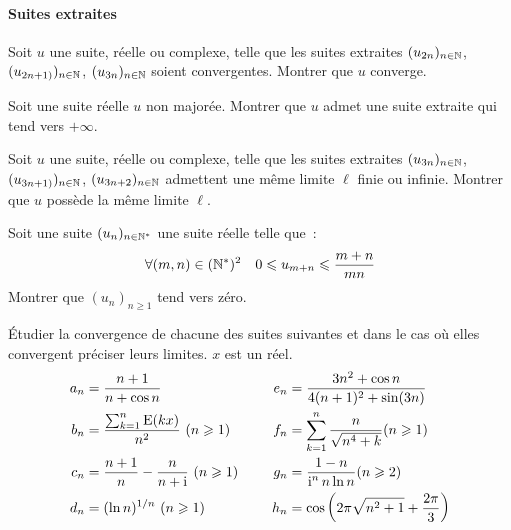 \paragraph{Suites extraites}
\begin{exercice}
    Soit \(u\) une suite, réelle ou complexe, telle que les suites 
    extraites \((u_{2n})_{n \in \mathbb{N}}\), \((u_{2n+1)})_{n \in \mathbb{N}}\), 
    \((u_{3n})_{n \in \mathbb{N}}\) soient convergentes. Montrer que \(u\) 
    converge.
\end{exercice}
\begin{exercice}
    Soit une suite réelle \(u\) non majorée. Montrer que \(u\) admet une 
    suite extraite qui tend vers \(+\infty\).
\end{exercice}
\begin{exercice}
    Soit \(u\) une suite, réelle ou complexe, telle que les suites 
    extraites \((u_{3n})_{n \in \mathbb{N}}\), \((u_{3n+1)})_{n \in \mathbb{N}}\), 
    \((u_{3n+2})_{n \in \mathbb{N}}\) admettent une même limite \(\ell\) finie 
    ou infinie. Montrer que \(u\) possède la même limite \(\ell\).
\end{exercice}
\begin{exercice}
    Soit une suite \((u_n)_{n \in \mathbb{N}^*}\) une suite réelle telle que~:
    \[\forall (m,n) \in (\mathbb{N}^*)^2 \quad 0 \leqslant u_{m+n} \leqslant 
    \frac{m+n}{mn}\]
    Montrer que \((u_n)_{n\geqslant 1}\) tend vers zéro.
\end{exercice}
\begin{exercice}
    Étudier la convergence de chacune des suites suivantes et dans le 
    cas où elles convergent préciser leurs limites. \(x\) est un réel.
    \begin{align*}
        a_n &= \frac{n+1}{n+\cos n} \qquad & e_n & = \frac{3n^2+\cos 
        n}{4(n+1)^2+\sin(3n)} \\
        b_n &= \frac{\sum_{k = 1}^n \operatorname{E}(kx)}{n^2} \ (n \geqslant 1) 
        \qquad & f_n &= \sum_{k = 1}^n \frac{n}{\sqrt{n^4+k}} (n 
        \geqslant 1) \\
        c_n &= \frac{n+1}{n} - \frac{n}{n+\operatorname{i}} \ (n \geqslant 1) \quad & 
        g_n &= \frac{1-n}{\operatorname{i}^n n \ln n} (n\geqslant 2) \\
        d_n &= (\ln n)^{1/n} \ (n \geqslant 1) \quad & h_n &= 
        \cos\left(2\pi\sqrt{n^2+1}+\frac{2\pi}{3}\right)
    \end{align*}
\end{exercice}
